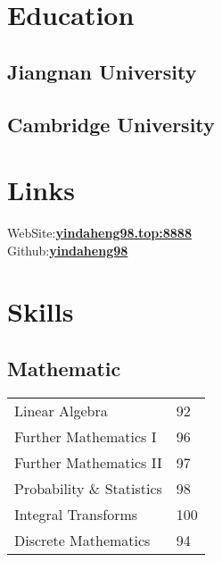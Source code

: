 \documentclass[]{deedy-resume-openfont}
\begin{document}
%
%

%
%

%
%

\begin{minipage}[t]{0.25\textwidth} 


\section{Education} 
\subsection{Jiangnan University}
\sectionsep
\subsection{Cambridge University}
\sectionsep

\section{Links}
WebSite:\newline\href{http://yindaheng98.top:8888}{\bf yindaheng98.top:8888} \\
Github:\href{https://github.com/yindaheng98}{\bf yindaheng98}
\sectionsep

\section{Skills}
\subsection{Mathematic }
\begin{tabular}{ll}
    Linear Algebra           & 92  \\
    Further Mathematics I     & 96  \\
    Further Mathematics II     & 97  \\
    Probability \& Statistics   & 98  \\
    Integral Transforms & 100 \\
    Discrete Mathematics & 94 \\
\end{tabular}
\sectionsep

\end{minipage}
\end{document}
